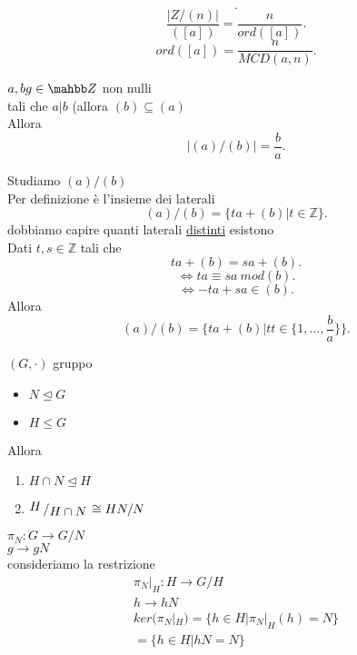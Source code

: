\documentclass[12px]{article}
\begin{document}
{\[	.\] 
	\[
		\frac {|Z/(n)|}{([a])} = \frac n {ord([a])}
	.\] 
	\[
		ord([a]) = \frac n {MCD(a,n)}
	.\] 
	\begin{lemm}
		$a,bg\in \mahbb Z$ non nulli\\
		tali che  $a|b$ (allora  $(b)\subseteq (a)$ \\
		Allora\\
		\[
		|(a)/(b)| = \frac ba
		.\] 
	\end{lemm}
	\begin{dimo}
		Studiamo $(a)/(b)$\\
		Per definizione è l'insieme dei laterali\\
		 \[
			 (a)/(b) = \{ta + (b) | t\in \mathbb Z\}
		.\] 
		dobbiamo capire quanti laterali \underline{distinti} esistono\\
		Dati $t,s\in \mathbb Z$ tali che\\
		\[
		ta + (b) = sa + (b)
		.\] 
		\[
		\Leftrightarrow ta \equiv sa \ mod(b)
		.\] 
		\[
		\Leftrightarrow -ta + sa \in(b)
		.\] 
		Allora\\
		\[
			(a)/(b) = \{ta + (b)|tt\in\{1,\ldots,\frac ba\}\}
		.\] 
	\end{dimo}
	\newpage
	\begin{teo}
		$(G,\cdot)$ gruppo\\
		\begin{itemize}
			\item $N\trianglelefteq G$\\
			\item  $H\leq G$
		\end{itemize}
		Allora
		\begin{enumerate}
			\item$H\cap N\trianglelefteq H$\\
			\item  $\bigslant H {H\cap N}\cong HN/N$
		\end{enumerate}
	\end{teo}
		\begin{dimo}
			$\pi_N:G \rightarrow G/N$\\
			$g \rightarrow gN$\\
			consideriamo la restrizione\\
			\begin{gather*}
				\pi_N|_H:H \rightarrow G/H\\
				h \rightarrow hN\\
				ker (\pi_N|_H) = \{h\in H| \pi_N|_H(h) = N\}\\
					       =\{h\in H|hN = N\}\\

\end{gather*}
\end{dimo}}
\end{document}
